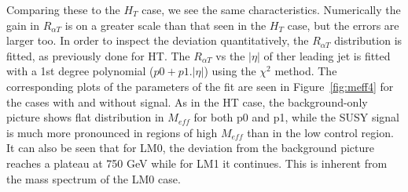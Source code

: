 Comparing these to the $H_{T}$ case, we see the same characteristics. Numerically the gain in $R_{\alpha T}$ is on a greater scale than that seen in the $H_{T}$ case, but the errors are larger too. In order to inspect the deviation quantitatively, the $R_{\alpha T}$ distribution is fitted, as previously done for HT. The $R_{\alpha T}$ vs the $|\eta|$ of ther leading jet is fitted with a 1st degree polynomial ($p0+p1.|\eta|$) using the $\chi^{2}$ method. The corresponding plots of the parameters of the fit are seen in Figure~\ref{fig:meff4} for the cases with and without signal. As in the HT case, the background-only picture shows flat distribution in $M_{eff}$ for both p0 and p1, while the SUSY signal is much more pronounced in regions of high $M_{eff}$ than in the low control region. It can also be seen that for LM0, the deviation from the background picture reaches a plateau at 750 GeV while for LM1 it continues. This is inherent from the mass spectrum of the LM0 case. 
